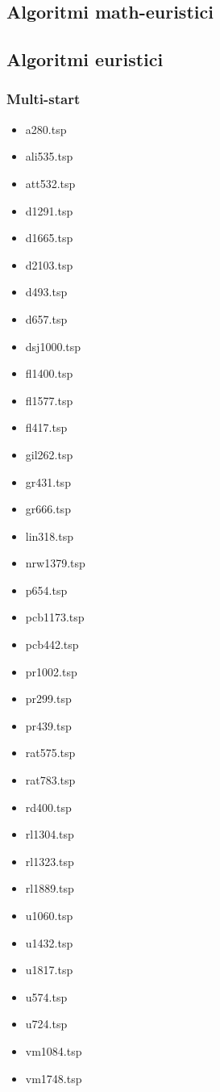 \subsection{Algoritmi math-euristici}

\subsection{Algoritmi euristici}
\subsubsection{Multi-start}\label{construction_perf}
\begin{center}
\begin{multicols}{4}
\begin{itemize}
\item{a280.tsp}
\item{ali535.tsp}
\item{att532.tsp}
\item{d1291.tsp}
\item{d1665.tsp}
\item{d2103.tsp}
\item{d493.tsp}
\item{d657.tsp}
\item{dsj1000.tsp}
\item{fl1400.tsp}
\item{fl1577.tsp}
\item{fl417.tsp}
\item{gil262.tsp}
\item{gr431.tsp}
\item{gr666.tsp}
\item{lin318.tsp}
\item{nrw1379.tsp}
\item{p654.tsp}
\item{pcb1173.tsp}
\item{pcb442.tsp}
\item{pr1002.tsp}
\item{pr299.tsp}
\item{pr439.tsp}
\item{rat575.tsp}
\item{rat783.tsp}
\item{rd400.tsp}
\item{rl1304.tsp}
\item{rl1323.tsp}
\item{rl1889.tsp}
\item{u1060.tsp}
\item{u1432.tsp}
\item{u1817.tsp}
\item{u574.tsp}
\item{u724.tsp}
\item{vm1084.tsp}
\item{vm1748.tsp}
\end{itemize}
\end{multicols}
\end{center}

